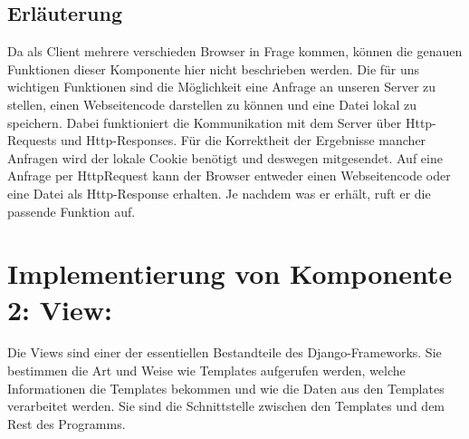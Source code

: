 \subsection{Erl\"auterung}

Da als Client mehrere verschieden Browser in Frage kommen, können die genauen
Funktionen dieser Komponente hier nicht beschrieben werden. Die für uns
wichtigen Funktionen sind die Möglichkeit eine Anfrage an unseren Server zu
stellen, einen Webseitencode darstellen zu können und eine Datei lokal zu
speichern. Dabei funktioniert die Kommunikation mit dem Server über
Http-Requests und Http-Responses. Für die Korrektheit der Ergebnisse mancher
Anfragen wird der lokale Cookie benötigt und deswegen mitgesendet. 
Auf eine Anfrage per HttpRequest kann der Browser entweder einen Webseitencode 
oder eine Datei als Http-Response erhalten. Je nachdem was er erhält, ruft er 
die passende Funktion auf. 


\section{Implementierung von Komponente
         2: View:}


Die Views sind einer der essentiellen Bestandteile des Django-Frameworks. Sie
bestimmen die Art und Weise wie Templates aufgerufen werden, welche
Informationen die Templates bekommen und wie die Daten aus den Templates
verarbeitet werden. Sie sind die Schnittstelle zwischen den Templates und dem
Rest des Programms.

